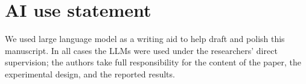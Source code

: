 \documentclass{article} %
\begin{document}
\section*{AI use statement}

We used large language model as a writing aid to help draft and polish this manuscript. In all cases the LLMs were used under the researchers' direct supervision; the authors take full responsibility for the content of the paper, the experimental design, and the reported results.
\end{document}
